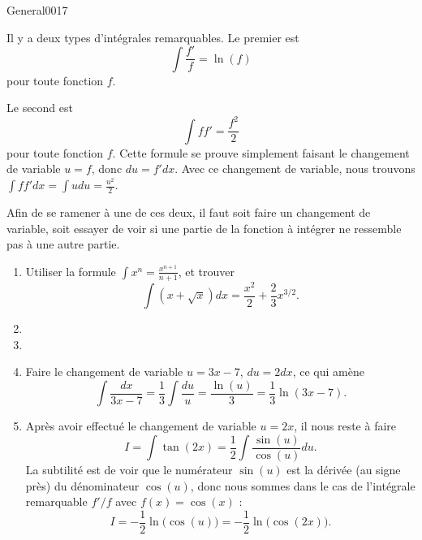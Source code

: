 \begin{corrige}{General0017}

Il y a deux types d'intégrales remarquables. Le premier est
\begin{equation}
	\int\frac{ f' }{ f }=\ln(f)
\end{equation}
pour toute fonction $f$.

Le second est
\begin{equation}
	\int ff'=\frac{ f^2 }{2}
\end{equation}
pour toute fonction $f$. Cette formule se prouve simplement faisant le changement de variable $u=f$, donc $du=f'dx$. Avec ce changement de variable, nous trouvons $\int ff'dx=\int udu=\frac{ u^2 }{2}$.

Afin de se ramener à une de ces deux, il faut soit faire un changement de variable, soit essayer de voir si une partie de la fonction à intégrer ne ressemble pas à une autre partie.

\renewcommand{\theenumi}{\arabic{enumi}}
\begin{enumerate}

\item
Utiliser la formule $\int x^n=\frac{ x^{n+1} }{ n+1 }$, et trouver
\begin{equation}
	\int(x+\sqrt{x})dx=\frac{ x^2 }{ 2 }+\frac{ 2 }{ 3 }x^{3/2}.
\end{equation}

\item
\item

\item
Faire le changement de variable $u=3x-7$, $du=2dx$, ce qui amène
\begin{equation}
	\int \frac{dx}{ 3x-7 }=\frac{1}{ 3 }\int \frac{ du }{ u }=\frac{ \ln(u) }{ 3 }=\frac{1}{ 3 }\ln(3x-7).
\end{equation}

\item\label{ItemIntCinq}
Après avoir effectué le changement de variable $u=2x$, il nous reste à faire
\begin{equation}
	I=\int\tan(2x)=\frac{1}{ 2 }\int\frac{ \sin(u) }{ \cos(u) }du.
\end{equation}
La subtilité est de voir que le numérateur $\sin(u)$ est la dérivée (au signe près) du dénominateur $\cos(u)$, donc nous sommes dans le cas de l'intégrale remarquable $f'/f$ avec $f(x)=\cos(x)$ :
\begin{equation}
	I=-\frac{ 1 }{2}\ln\big( \cos(u) \big)=-\frac{ 1 }{2}\ln\big( \cos(2x) \big).
\end{equation}


\end{enumerate}
\end{corrige}
